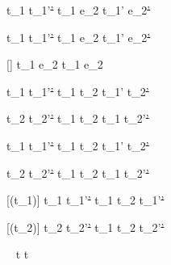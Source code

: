   {t_1\st{}  t_1'\st{'}}
  {t_1 \Then e_2\st{}  t_1' \Then e_2\st{'}}

  {t_1\st{}  t_1'\st{'}}
  {t_1 \Next e_2\st{}  t_1' \Next e_2\st{'}}

[\neq \bot \wedge \neg{}]
  { }
  {t_1 \Next e_2\st{} \handle{\Continue} t_1 \Then e_2\st{}}


  {t_1\st{}  t_1'\st{'} }
  {t_1 \And t_2\st{}  t_1' \And t_2\st{'}}

  {t_2\st{}  t_2'\st{'} }
  {t_1\st{} \And t_2  t_1 \And t_2'\st{'}}


  {t_1\st{}  t_1'\st{'} }
  {t_1 \Or t_2\st{}  t_1' \Or t_2\st{'}}

  {t_2\st{}  t_2'\st{'} }
  {t_1 \Or t_2\st{}  t_1 \Or t_2'\st{'}}


[\Failing(t_1)]
  {t_1\st{}  t_1'\st{'}}
  {t_1 \Xor t_2\st{}  t_1'\st{'}}

[\Failing(t_2)]
  {t_2\st{}  t_2'\st{'}}
  {t_1 \Xor t_2\st{}  t_2'\st{'}}

  {\ }
  {t\st{} \handle{\Pick \Here} t\st{}}










